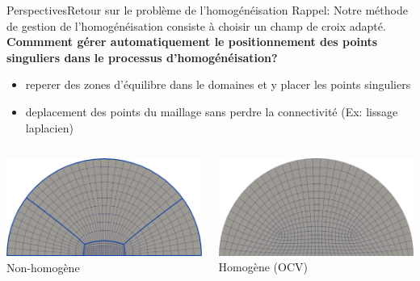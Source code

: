 \documentclass[compress,10pt,aspectratio=169]{beamer}
\begin{document}
\begin{frame}{Perspectives}{Retour sur le problème de l'homogénéisation}
\small
Rappel: Notre méthode de gestion de l'homogénéisation consiste à choisir un champ de croix adapté.\\\vspace{0.2cm}
{\bf Commment gérer automatiquement le positionnement des points singuliers dans le processus d'homogénéisation?}\\\vspace{0.2cm}
\begin{itemize}
    \item reperer des zones d'équilibre dans le domaines et y placer les points singuliers
    \item deplacement des points du maillage sans perdre la connectivité (Ex: lissage laplacien)\\\vspace{0.2cm}
\end{itemize}
\begin{columns}
    \begin{column}{0.55\textwidth}
\centering
\includegraphics[scale=0.09]{images/non_homo_demiDisc.pdf}\\
\footnotesize Non-homogène
    \end{column}
    \begin{column}{0.55\textwidth}
        \centering
\includegraphics[scale=0.09]{images/homo_avec_bord_demiDisc.pdf}\\
\footnotesize Homogène (OCV)
    \end{column}
\end{columns}
\end{frame}
\end{document}
